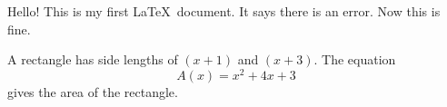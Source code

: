 \documentclass[12pt]{article}
\begin{document}
Hello! This is my first \LaTeX\ document.
It says there is an error. Now this is fine.

A rectangle has side lengths of $(x+1)$ and $(x+3)$.
The equation $${A(x)=x^2+4x+3}$$ gives the area of the rectangle.
\end{document}
